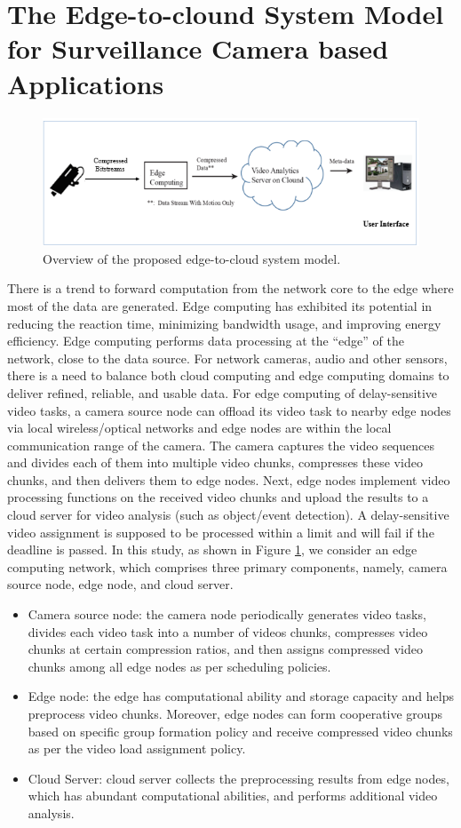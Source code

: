 \section{The Edge-to-clound System Model for Surveillance Camera based Applications}
\begin{figure}
\centering
 \includegraphics[width=1.0\linewidth]{Figures/arch.png}
 \caption{ Overview of the proposed edge-to-cloud system model.}
 \label{fig:arch}
\end{figure}
There is a trend to forward computation from the network core to the edge where most of the data are generated. Edge computing has exhibited its potential in reducing the reaction time, minimizing bandwidth usage, and improving energy efficiency. Edge computing performs data processing at the “edge” of the network, close to the data source. For network cameras, audio and other sensors, there is a need to balance both cloud computing and edge computing domains to deliver refined, reliable, and usable data. For edge computing of delay-sensitive video tasks, a camera source node can offload its video task to nearby edge nodes via local wireless/optical networks and edge nodes are within the local communication range of the camera. The camera captures the video sequences and divides each of them into multiple video chunks, compresses these video chunks, and then delivers them to edge nodes. Next, edge nodes implement video processing functions on the received video chunks and upload the results to a cloud server for video analysis (such as object/event detection). A delay-sensitive video assignment is supposed to be processed within a limit and will fail if the deadline is passed. In this study, as shown in Figure \ref{fig:arch}, we consider an edge computing network, which comprises three primary components, namely, camera source node, edge node, and cloud server.
\begin{itemize}
\item Camera source node: the camera node periodically generates video tasks, divides each video task into a number of videos chunks, compresses video chunks at certain compression ratios, and then assigns compressed video chunks among all edge nodes as per scheduling policies.
\item Edge node: the edge has computational ability and storage capacity and helps preprocess video chunks. Moreover, edge nodes can form cooperative groups based on specific group formation policy and receive compressed video chunks as per the video load assignment policy.
\item Cloud Server: cloud server collects the preprocessing results from edge nodes, which has abundant computational abilities, and performs additional video analysis.
\end{itemize}
